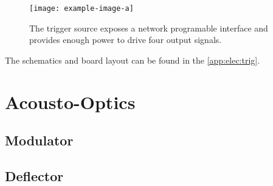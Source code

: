 \begin{figure}[h]
  \centering
  \texttt{[image: example-image-a]}
  \caption{The trigger source exposes a network programable interface and
  provides enough power to drive four output signals.}
  \label{fig:elec:trig}
\end{figure}

The schematics and board layout can be found in the \cref{app:elec:trig}.

\section{Acousto-Optics}

\subsection{Modulator}

\subsection{Deflector}
